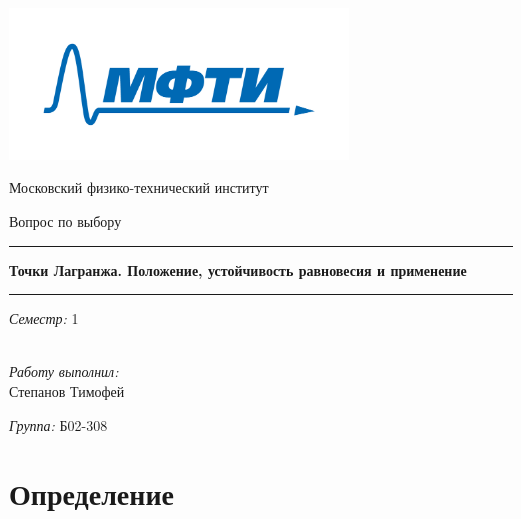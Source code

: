 \documentclass[a4paper]{article} %
\begin{document}
	\fontsize{14pt}{11.75pt}\selectfont
	
	\begin{titlepage}
		\begin{center}

			\includegraphics[width=90mm]{title.png}
			\vspace{5mm}
			
			{\Huge Московский физико-технический институт}
			
			\vspace{5mm}
			{\LARGE Вопрос по выбору}
			
			\vspace{6mm}
			\noindent\rule{15cm}{0.5pt}
			
			\vspace{2mm}
			{\Huge \textbf{Точки Лагранжа. \linebreak Положение, устойчивость равновесия и применение}}
			\vspace{-2mm}
			
			\noindent\rule{15cm}{0.5pt}
			
			{\Large \begin{multicols}{2}
					\textit{}
					
					\textit{Семестр:} 1 \\ \
					
					\textit{Работу выполнил:} \\ Степанов Тимофей
					
					\textit{Группа:} Б02-308
					
			\end{multicols}}
		\end{center}
	\end{titlepage}
	
\section{Определение}
\end{document}
